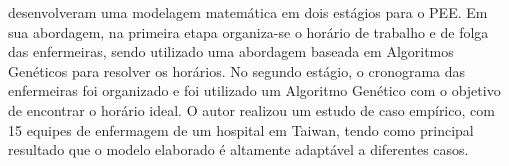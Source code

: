 
\cite{tsai:2009} desenvolveram uma modelagem matemática em dois estágios para o \ac{PEE}. Em sua abordagem, na primeira etapa organiza-se o horário de trabalho e de folga das enfermeiras,  sendo utilizado uma abordagem baseada em Algoritmos Genéticos para resolver os horários. No segundo estágio, o cronograma das enfermeiras foi organizado e foi utilizado um  Algoritmo Genético com o objetivo de encontrar o horário ideal. O autor realizou um estudo de caso empírico, com 15 equipes de enfermagem de um hospital em Taiwan, tendo como principal resultado que o modelo elaborado é altamente adaptável a diferentes casos.

 

